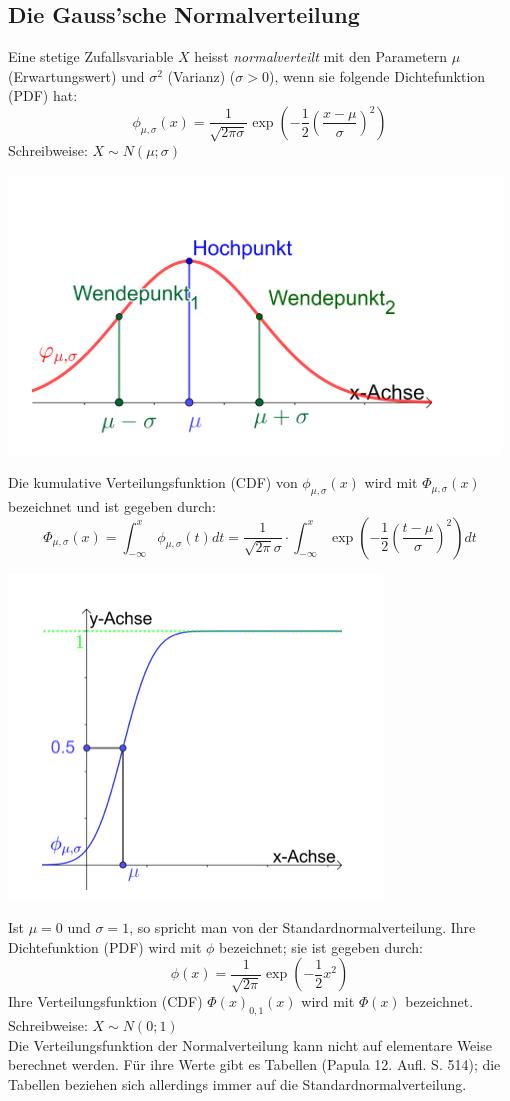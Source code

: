 \subsection{Die Gauss'sche Normalverteilung}
\label{subsec:gauss_sche_normalverteilung}
Eine stetige Zufallsvariable $X$ heisst \textit{normalverteilt} mit den Parametern $\mu$ (Erwartungswert) und $\sigma^2$ (Varianz) ($\sigma > 0$),
wenn sie folgende Dichtefunktion (PDF) hat:
\begin{equation*}
    \phi_{\mu, \sigma}(x) = \frac{1}{\sqrt{2\pi\sigma}}\exp(-\frac{1}{2}(\frac{x-\mu}{\sigma})^2)
\end{equation*}
Schreibweise: $X \sim N(\mu;\sigma)$ \\
\begin{center}
    \includegraphics[width=0.5\linewidth]{images/gauss.png}
\end{center}
Die kumulative Verteilungsfunktion (CDF) von $\phi_{\mu, \sigma}(x)$ wird mit $\Phi_{\mu, \sigma}(x)$ bezeichnet und ist gegeben durch:
\begin{equation*}
    \Phi_{\mu, \sigma}(x) = \int_{-\infty}^x \phi_{\mu, \sigma}(t)dt = \frac{1}{\sqrt{2\pi}\sigma}\cdot\int_{-\infty}^x 
    \exp(-\frac{1}{2}(\frac{t-\mu}{\sigma})^2)dt
\end{equation*}
\begin{center}
    \includegraphics[width=0.5\linewidth]{images/gauss2.png}
\end{center}
Ist $\mu = 0$ und $\sigma = 1$, so spricht man von der Standardnormalverteilung. Ihre Dichtefunktion (PDF) wird mit $\phi$ bezeichnet; sie ist gegeben durch:
\begin{equation*}
    \phi(x) = \frac{1}{\sqrt{2\pi}}\exp(-\frac{1}{2}x^2)
\end{equation*}
Ihre Verteilungsfunktion (CDF) $\Phi(x)_{0,1}(x)$ wird mit $\Phi(x)$ bezeichnet. \\
Schreibweise: $X \sim N(0;1)$ \\
Die Verteilungsfunktion der Normalverteilung kann nicht auf elementare Weise berechnet werden. 
Für ihre Werte gibt es Tabellen (Papula 12. Aufl. S. 514); die Tabellen beziehen sich allerdings immer auf die Standardnormalverteilung.
